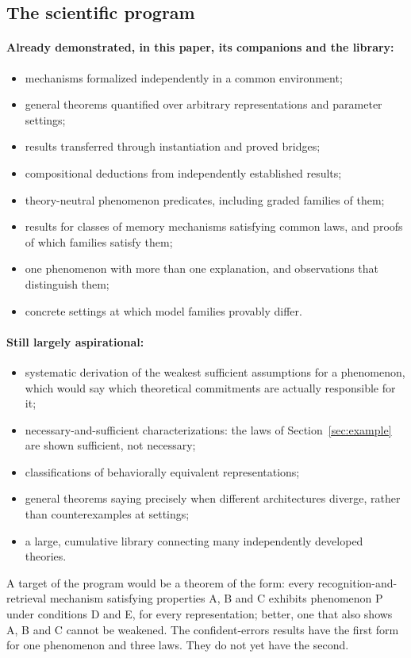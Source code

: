 \documentclass[11pt]{article}
\begin{document}
\subsection{The scientific program}
\label{sec:program}

\paragraph{Already demonstrated, in this paper, its companions and the library:}
\begin{itemize}
  \item mechanisms formalized independently in a common environment;
  \item general theorems quantified over arbitrary representations and parameter settings;
  \item results transferred through instantiation and proved bridges;
  \item compositional deductions from independently established results;
  \item theory-neutral phenomenon predicates, including graded families of them;
  \item results for classes of memory mechanisms satisfying common laws, and proofs of which families satisfy them;
  \item one phenomenon with more than one explanation, and observations that distinguish them;
  \item concrete settings at which model families provably differ.
\end{itemize}

\paragraph{Still largely aspirational:}
\begin{itemize}
  \item systematic derivation of the weakest sufficient assumptions for a phenomenon, which would say which theoretical commitments are actually responsible for it;
  \item necessary-and-sufficient characterizations: the laws of Section~\ref{sec:example} are shown sufficient, not necessary;
  \item classifications of behaviorally equivalent representations;
  \item general theorems saying precisely when different architectures diverge, rather than counterexamples at settings;
  \item a large, cumulative library connecting many independently developed theories.
\end{itemize}
A target of the program would be a theorem of the form: every recognition-and-retrieval mechanism satisfying properties A, B and C exhibits phenomenon P under conditions D and E, for every representation; better, one that also shows A, B and C cannot be weakened. The confident-errors results have the first form for one phenomenon and three laws. They do not yet have the second.
\end{document}
